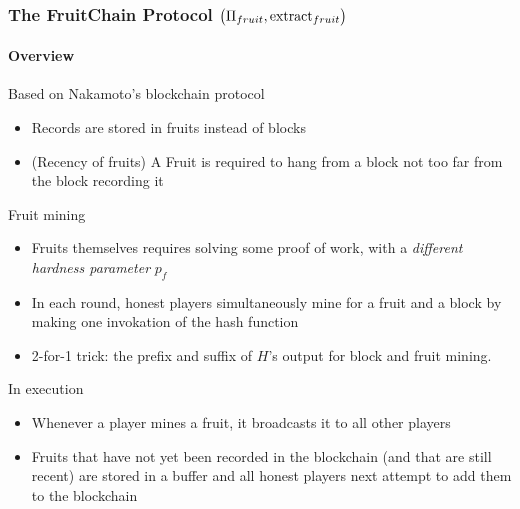 \documentclass{beamer}
\newcommand{\frt}{\big(\Pi_{fruit}, {\rm extract}_{fruit}\big)}
\begin{document}
\begin{spacing}{1.2}
\begin{frame}
	\frametitle{The FruitChain Protocol $\frt$}
	\framesubtitle{Overview}
	\vspace{-7pt}
	\begin{block}{Based on Nakamoto’s blockchain protocol}
		\begin{itemize}
			\item Records are stored in fruits instead of blocks
			\item (Recency of fruits) A Fruit is required to hang from a block not too far from the block recording it
		\end{itemize}
	\end{block}
	\vspace{-3pt}
	\begin{block}{Fruit mining}
		\begin{itemize}
			\item Fruits themselves requires solving some proof of work, with a \textit{different hardness parameter} $p_f$
			\item In each round, honest players simultaneously mine for a fruit and a block by making one invokation of the hash function
			\item 2-for-1 trick: the prefix and suffix of $H$'s output for block and fruit mining.%
		\end{itemize}
	\end{block}
	\vspace{-3pt}
	\begin{block}{In execution}
		\begin{itemize}
			\item Whenever a player mines a fruit, it broadcasts it to all other players
			\item Fruits that have not yet been recorded in the blockchain (and that are still recent) are stored in a buffer and all honest players next attempt to add them to the blockchain
		\end{itemize}
	\end{block}
\end{frame}


\end{spacing}
\end{document}
